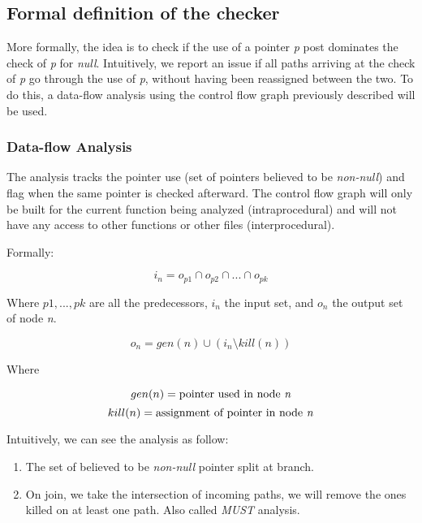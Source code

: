 \subsection{Formal definition of the checker}
\label{subsec:checker_formal_definition}
More formally, the idea is to check if the use of a pointer \emph{p} post dominates the check of \emph{p} for \emph{null}.
Intuitively, we report an issue if all paths arriving at the check of \emph{p} go through the use of \emph{p}, without having been reassigned between the two. 
To do this, a data-flow analysis using the control flow graph previously described will be used.

\subsubsection{Data-flow Analysis}
\label{subsubsec:data_flow_analysis}

The analysis tracks the pointer use (set of pointers believed to be \emph{non-null}) and flag when the same pointer is checked afterward.
The control flow graph will only be built for the current function being analyzed (intraprocedural) and will not have any access to other functions or other files (interprocedural).

Formally:

\begin{equation}\label{eqn:dataflow1}
i_{n} = o_{p1}  \cap   o_{p2}  \cap  ... \cap   o_{pk}
\end{equation}

Where $p1, ..., pk$ are all the predecessors, $i_{n}$ the input set, and  $o_{n}$ the output set of node \emph{n}.

\begin{equation}\label{eqn:dataflow2}
o_{n} = gen(n)  \cup   (i_{n} \setminus kill(n))
\end{equation}

Where

\begin{equation}\label{eqn:dataflow3}
gen(n) =\text{pointer used in node \emph{n}}
\end{equation}
\begin{equation}\label{eqn:dataflow4}
kill(n) = \text{assignment of pointer in node \emph{n}}
\end{equation}

\pagebreak

Intuitively, we can see the analysis as follow:
\begin{enumerate}
	\item The set of believed to be \emph{non-null} pointer split at branch. \newline 
	\item On join, we take the intersection of incoming paths, we will remove the ones killed on at least one path. Also called \emph{MUST} analysis. \newline 
\end{enumerate}

